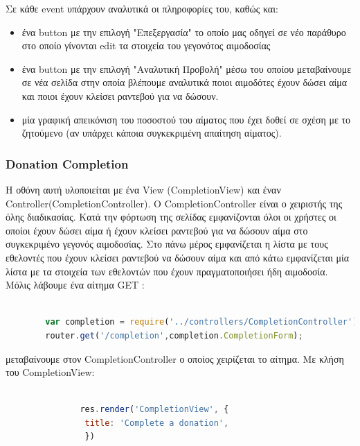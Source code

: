 		Σε κάθε event υπάρχουν αναλυτικά οι πληροφορίες του, καθώς και:
		
		\begin{itemize}
		\item ένα button με την επιλογή "Επεξεργασία" το οποίο μας οδηγεί σε νέο παράθυρο στο οποίο γίνονται edit τα στοιχεία του γεγονότος αιμοδοσίας
		
		\item ένα button με την επιλογή "Αναλυτική Προβολή" μέσω του οποίου μεταβαίνουμε σε νέα σελίδα στην οποία βλέπουμε αναλυτικά ποιοι αιμοδότες έχουν δώσει αίμα και ποιοι έχουν κλείσει ραντεβού για να δώσουν.
		
		\item μία γραφική απεικόνιση του ποσοστού του αίματος που έχει δοθεί σε σχέση με το ζητούμενο (αν υπάρχει κάποια συγκεκριμένη απαίτηση αίματος).
		
		\end{itemize}


	
	
				\subsubsection{Donation Completion}
		
	Η οθόνη αυτή υλοποιείται με ένα View (CompletionView) και έναν Controller(CompletionController). O CompletionController είναι ο χειριστής της όλης διαδικασίας. Κατά την φόρτωση της σελίδας εμφανίζονται όλοι οι χρήστες οι οποίοι έχουν δώσει αίμα ή έχουν κλείσει ραντεβού για να δώσουν αίμα στο συγκεκριμένο γεγονός αιμοδοσίας. Στο πάνω μέρος εμφανίζεται η λίστα με τους εθελοντές που έχουν κλείσει ραντεβού να δώσουν αίμα και από κάτω εμφανίζεται μία λίστα με τα στοιχεία των εθελοντών που έχουν πραγματοποιήσει ήδη αιμοδοσία. Μόλις λάβουμε ένα αίτημα GET :
		
		\begin{lstlisting}[language=Javascript]			
		
		var completion = require('../controllers/CompletionController');
		router.get('/completion',completion.CompletionForm);  


		\end{lstlisting}
		
μεταβαίνουμε στον CompletionController ο οποίος χειρίζεται το αίτημα. Με κλήση του CompletionView:


		\begin{lstlisting}[language=Javascript]			

			   res.render('CompletionView', { 
                title: 'Complete a donation',
				})
				
		\end{lstlisting}
		
